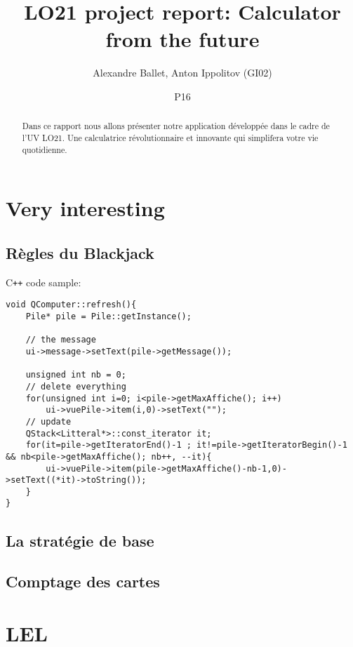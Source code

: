 \documentclass[titlepage]{article}
\begin{document}
\title{LO21 project report: Calculator from the future}
\author{Alexandre Ballet, Anton Ippolitov (GI02)}
\date{P16}
\maketitle

\tableofcontents

\begin{abstract}
Dans ce rapport nous allons présenter notre application développée dans le cadre de l'UV LO21. Une calculatrice révolutionnaire et innovante qui simplifera votre vie quotidienne.
\end{abstract}

\section{Very interesting}
\subsection{Règles du Blackjack}
C\texttt{++} code sample:
\begin{lstlisting}
void QComputer::refresh(){
    Pile* pile = Pile::getInstance();

    // the message
    ui->message->setText(pile->getMessage());

    unsigned int nb = 0;
    // delete everything
    for(unsigned int i=0; i<pile->getMaxAffiche(); i++)
        ui->vuePile->item(i,0)->setText("");
    // update
    QStack<Litteral*>::const_iterator it;
    for(it=pile->getIteratorEnd()-1 ; it!=pile->getIteratorBegin()-1 && nb<pile->getMaxAffiche(); nb++, --it){
        ui->vuePile->item(pile->getMaxAffiche()-nb-1,0)->setText((*it)->toString());
    }
}
\end{lstlisting}

\subsection{La stratégie de base}

\subsection{Comptage des cartes}

\section{LEL}
\end{document}
